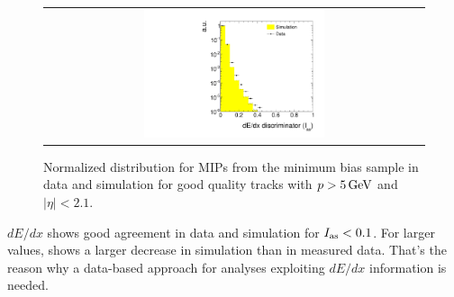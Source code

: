 \begin{figure}[!bt]
  \centering 
  \begin{tabular}{c}
    \includegraphics[width=0.49\textwidth]{figures/analysis/PixelCalibration/htrackASmiSmallRange_log_MIPs.pdf}
  \end{tabular}
  \caption{Normalized \ias distribution for MIPs from the minimum bias sample in data and simulation for good quality tracks with $p>5\,\text{Ge}\kern-0.06667em\text{V}$ and $|\eta|<2.1$.}
  \label{fig:Data-MC-Dedx_MIPs}
\end{figure}
$dE/dx$ shows good agreement in data and simulation for $I_{\text{as}}<0.1$.
For larger values, \ias shows a larger decrease in simulation than in measured data.
That's the reason why a data-based approach for analyses exploiting $dE/dx$ information is needed.\\


